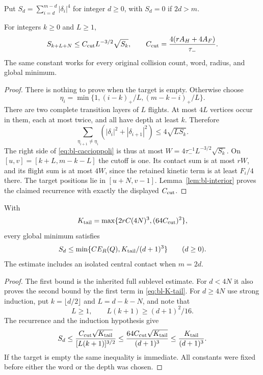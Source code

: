 Put $S_d=\sum_{i=d}^{m-d}|\delta_i|^4$ for integer $d\ge0$,
with $S_d=0$ if $2d>m$.
\begin{theorem}
\label{thm:bl-recurrence}
For integers $k\ge0$ and $L\ge1$,
\begin{equation}\label{eq:bl-recurrence}
 S_{k+L+N}\le C_{\rm cut} L^{-3/2}\sqrt{S_k},
 \qquad C_{\rm cut}=\frac{4(rA_H+4A_F)}{\tau_-}.
\end{equation}
The same constant works for every original collision count, word,
radius, and global minimum.
\end{theorem}
\begin{proof}
There is nothing to prove when the target is empty.  Otherwise choose
\[
 \eta_i=\min\{1,(i-k)_+/L,(m-k-i)_+/L\}.
\]
There are two complete transition layers of $L$ flights.  At most
$4L$ vertices occur in them, each at most twice, and all have
depth at least $k$.  Therefore
\[
 \sum_{\eta_{i+1}\ne\eta_i}
       (|\delta_i|^2+|\delta_{i+1}|^2)
 \le4\sqrt{L S_k}.
\]
The right side of \eqref{eq:bl-caccioppoli} is thus at most
$W=4\tau_-^{-1}L^{-3/2}\sqrt{S_k}$.  On
$[u,v]=[k+L,m-k-L]$ the cutoff is one.  Its contact sum is at
most $rW$, and its flight sum is at most $4W$, since the retained
kinetic term is at least $F_i/4$ there.  The target positions lie
in $[u+N,v-1]$.  Lemma~\ref{lem:bl-interior} proves the claimed
recurrence with exactly the displayed $C_{\rm cut}$.
\end{proof}

\begin{theorem}
\label{thm:bl-tail}
With
\begin{equation}\label{eq:bl-K-tail}
 K_{\rm tail}=\max\{2rC(4N)^3,(64C_{\rm cut})^2\},
\end{equation}
every global minimum satisfies
\begin{equation}\label{eq:bl-tail}
 S_d\le\min\{CE_R(Q),K_{\rm tail}/(d+1)^3\}
                    \qquad(d\ge0).
\end{equation}
The estimate includes an isolated central contact when $m=2d$.
\end{theorem}
\begin{proof}
The first bound is the inherited full sublevel estimate.  For
$d<4N$ it also proves the second bound by the first term in
\eqref{eq:bl-K-tail}.  For $d\ge4N$ use strong induction, put
$k=\lfloor d/2\rfloor$ and $L=d-k-N$, and note that
\[
 L\ge1,\qquad L(k+1)\ge(d+1)^2/16.
\]
The recurrence and the induction hypothesis give
\[
 S_d\le\frac{C_{\rm cut}\sqrt{K_{\rm tail}}}
                       {[L(k+1)]^{3/2}}
 \le\frac{64C_{\rm cut}\sqrt{K_{\rm tail}}}{(d+1)^3}
 \le\frac{K_{\rm tail}}{(d+1)^3}.
\]
If the target is empty the same inequality is immediate.  All
constants were fixed before either the word or the depth was chosen.
\end{proof}

